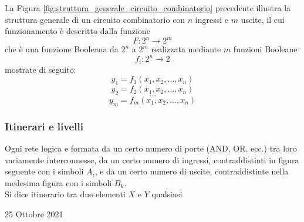 \documentclass[a4paper]{extarticle}
\begin{document}
\noindent
La Figura \ref{fig:struttura_generale_circuito_combinatorio} precedente illustra la struttura generale di un circuito combinatorio con \(n\) ingressi e \(m\) uscite, il cui funzionamento è descritto dalla funzione
\[F : 2^n \rightarrow 2^m\]
che è una funzione Booleana da \(2^n\) a \(2^m\) realizzata mediante \(m\) funzioni Booleane
\[f_i : 2^n \rightarrow 2\]
mostrate di seguito:
\[y_1 = f_1 (x_1, x_2, ..., x_n)\]
\[y_2 = f_2 (x_1, x_2, ..., x_n)\]
\[...\]
\[y_m = f_m (x_1, x_2, ..., x_n)\]

\vspace{1em}
\subsubsection{Itinerari e livelli}
Ogni rete logica e formata da un certo numero di porte (AND, OR, ecc.) tra loro variamente interconnesse, da un certo numero di ingressi, contraddistinti in figura seguente con i simboli \(A_i\), e da un certo numero di uscite, contraddistinte nella medesima figura con i simboli \(B_k\).\\
Si dice itinerario tra due elementi \(X\) e \(Y\) qualsiasi

\newpage
\begin{center}
    25 Ottobre 2021
\end{center}
\end{document}
